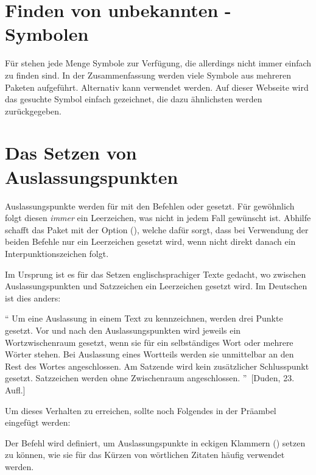 \section{Finden von unbekannten -Symbolen}
%
%
Für  stehen jede Menge Symbole zur Verfügung, die allerdings 
nicht immer einfach zu finden sind. In der Zusammenfassung
%
{}
werden viele Symbole aus mehreren Paketen aufgeführt. Alternativ kann 
 verwendet werden. 
Auf dieser Webseite wird das gesuchte Symbol einfach gezeichnet, die dazu 
ähnlichsten werden zurückgegeben.



\section{Das Setzen von Auslassungspunkten}
%
%
%
Auslassungspunkte werden für  mit den Befehlen  oder 
 gesetzt. Für gewöhnlich folgt diesen \emph{immer} ein 
Leerzeichen, was nicht in jedem Fall gewünscht ist. Abhilfe schafft das Paket 
 mit der Option (), welche 
dafür sorgt, dass bei Verwendung der beiden Befehle nur ein Leerzeichen gesetzt 
wird, wenn nicht direkt danach ein Interpunktionszeichen folgt.
%
\begin{quoting}
\begin{Code}
\usepackage[xspace]{ellipsis}
\end{Code}
\end{quoting}
%
Im Ursprung ist es für das Setzen englischsprachiger Texte gedacht, wo zwischen 
Auslassungspunkten und Satzzeichen ein Leerzeichen gesetzt wird. Im Deutschen 
ist dies anders:
%
\begin{quoting}
\enquote{%
  Um eine Auslassung in einem Text zu kennzeichnen, werden drei Punkte gesetzt. 
  Vor und nach den Auslassungspunkten wird jeweils ein Wortzwischenraum 
  gesetzt, wenn sie für ein selbständiges Wort oder mehrere Wörter stehen. Bei 
  Auslassung eines Wortteils werden sie unmittelbar an den Rest des Wortes 
  angeschlossen. Am Satzende wird kein zusätzlicher Schlusspunkt gesetzt. 
  Satzzeichen werden ohne Zwischenraum angeschlossen.%
}~[Duden, 23. Aufl.]
\end{quoting} 
%
Um dieses Verhalten zu erreichen, sollte noch Folgendes in der Präambel 
eingefügt werden:
%
\begin{quoting}
\begin{Code}
\let\ellipsispunctuation\relax
\newcommand*{\qdots}{[\dots{}]\xspace}
\end{Code}
\end{quoting}
%
Der Befehl  wird definiert, um Auslassungspunkte in eckigen 
Klammern (\POParameter{\dots}) setzen zu können, wie sie für das Kürzen von 
wörtlichen Zitaten häufig verwendet werden.



